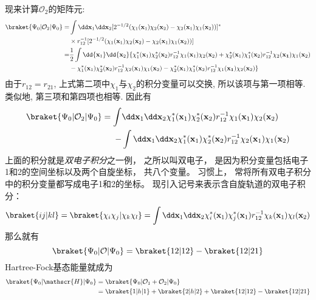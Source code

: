 
现来计算$\mathcal{O}_2$的矩阵元:
\begin{align}
\braket{\Psi_0|\mathcal{O}_2|\Psi_0}=&\int\dd\mathbf{x}_1\dd\mathbf{x}_2[2^{-1/2}(\chi_1(\mathbf{x}_1)\chi_2(\mathbf{x}_2)-\chi_2(\mathbf{x}_1)\chi_1(\mathbf{x}_2))]^*\notag\\
\qquad&\times r_{12}^{-1} [2^{-1/2}(\chi_1(\mathbf{x}_1)\chi_2(\mathbf{x}_2)-\chi_2(\mathbf{x}_1)\chi_1(\mathbf{x}_2))]\notag\\
=&\frac{1}{2}\int\dd{\mathbf{x}_1}\dd{\mathbf{x}_2}\{\chi_1^*(\mathbf{x}_1)\chi_2^*(\mathbf{x}_2)r_{12}^{-1}\chi_1(\mathbf{x}_1)\chi_2(\mathbf{x}_2) + \chi_2^*(\mathbf{x}_1)\chi_1^*(\mathbf{x}_2)r_{12}^{-1}\chi_2(\mathbf{x_1})\chi_1(\mathbf{x}_2) \notag\\
\qquad& - \chi_1^*(\mathbf{x}_1)\chi_2^*(\mathbf{x}_2)r_{12}^{-1}\chi_2(\mathbf{x}_1)\chi_1(\mathbf{x}_2) - \chi_2^*(\mathbf{x}_1)\chi_1^*(\mathbf{x}_2)r_{12}^{-1}\chi_1(\mathbf{x_1})\chi_2(\mathbf{x}_2)
\}
\end{align}
由于$r_{12}=r_{21}$, 
上式第二项中$\chi_1$与$\chi_2$的积分变量可以交换, 
所以该项与第一项相等. 
类似地, 
第三项和第四项也相等. 
因此有
\begin{align}
\braket{\Psi_0|\mathcal{O}_2|\Psi_0}=\int&\dd\mathbf{x}_1\dd\mathbf{x}_2 \chi_1^*(\mathbf{x}_1)\chi_2^*(\mathbf{x}_2)r_{12}^{-1}\chi_1(\mathbf{x}_1)\chi_2(\mathbf{x}_2)\notag\\
 -& \int\dd\mathbf{x}_1\dd\mathbf{x}_2\chi_1^*(\mathbf{x}_1)\chi_2^*(\mathbf{x}_2)r_{12}^{-1}\chi_2(\mathbf{x}_1)\chi_1(\mathbf{x}_2)
\end{align}
上面的积分就是\emph{双电子积分}之一例，
之所以叫双电子，
是因为积分变量包括电子1和2的空间坐标以及两个自旋坐标，
共八个变量。
习惯上，
常将所有双电子积分中的积分变量都写成电子1和2的坐标。
现引入记号来表示含自旋轨道的双电子积分：
\begin{equation}
\braket{ij|kl}=\braket{\chi_i\chi_j|\chi_k\chi_l}=\int\dd\mathbf{x}_1\dd\mathbf{x}_2\chi_i^*(\mathbf{x}_1)\chi_j^*(\mathbf{x}_1)r_{12}^{-1}\chi_k(\mathbf{x}_1)\chi_l(\mathbf{x}_2)
\label{2.90}
\end{equation}
那么就有
\begin{equation}
\braket{\Psi_0|\mathcal{O}|\Psi_0}=\braket{12|12}-\braket{12|21}
\end{equation}
Hartree-Fock基态能量就成为
\begin{align}
\label{2.92}
\braket{\Psi_0|\mathscr{H}|\Psi_0}&=\braket{\Psi_0|\mathcal{O}_1+\mathcal{O}_2|\Psi_0}\notag\\
&=\braket{1|h|1}+\braket{2|h|2}+\braket{12|12}-\braket{12|21}
\end{align}

